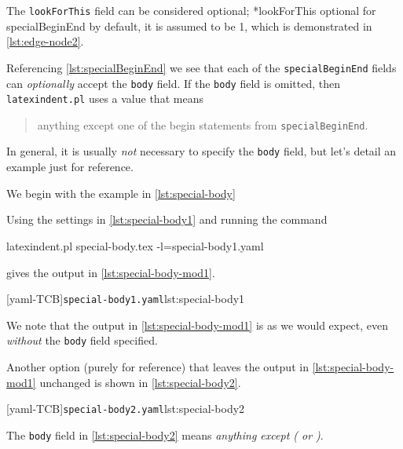 \documentclass[10pt]{article}
\begin{document}
 The \texttt{lookForThis} field can be considered optional;
 *{lookForThis optional for specialBeginEnd} by default, it is
 assumed to be 1, which is demonstrated in \cref{lst:edge-node2}.%

 Referencing \vref{lst:specialBeginEnd} we see that  each of the \texttt{specialBeginEnd} fields can \emph{optionally} accept the
 \texttt{body} field. If the \texttt{body} field is omitted, then \texttt{latexindent.pl}
 uses a value that means
 \begin{quote}
  anything except one of the begin statements from \texttt{specialBeginEnd}.
 \end{quote}

 In general, it is usually \emph{not} necessary to specify the \texttt{body} field, but
 let's detail an example just for reference.

 \begin{example}
 We begin with the example in \cref{lst:special-body}


 Using the settings in \cref{lst:special-body1} and running the command

 \begin{commandshell}
latexindent.pl special-body.tex -l=special-body1.yaml
\end{commandshell}

 gives the output in \cref{lst:special-body-mod1}.

 \begin{cmhtcbraster}[ raster left skip=-3.5cm,]
  [yaml-TCB]{\texttt{special-body1.yaml}}{lst:special-body1}
 \end{cmhtcbraster}
 We note that the output in \cref{lst:special-body-mod1} is as we would expect, even
 \emph{without} the \texttt{body} field specified.

 Another option (purely for reference) that leaves the output in
 \cref{lst:special-body-mod1} unchanged is shown in \cref{lst:special-body2}.

 [yaml-TCB]{\texttt{special-body2.yaml}}{lst:special-body2}

 The \texttt{body} field in \cref{lst:special-body2} means \emph{anything except ( or )}.
 \end{example}
\end{document}
